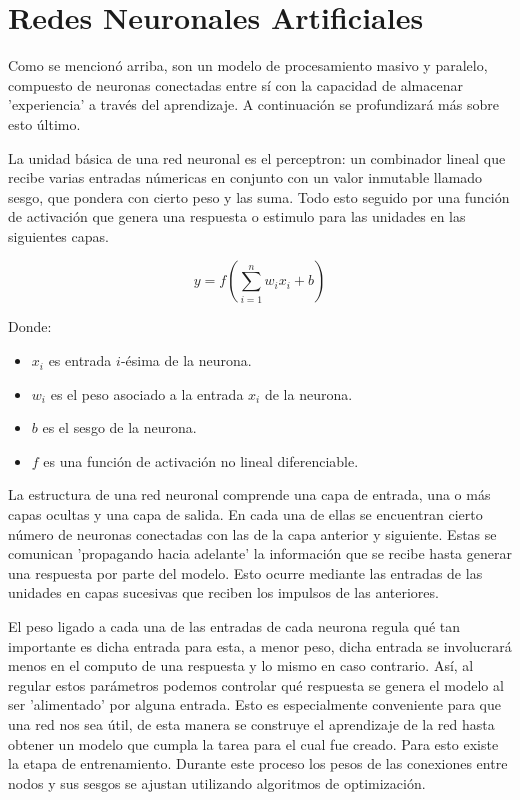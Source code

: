 \section{Redes Neuronales Artificiales}
Como se mencionó arriba, son un modelo de procesamiento masivo y paralelo, compuesto de neuronas conectadas entre sí con la capacidad de almacenar 'experiencia' a través del aprendizaje. A continuación se profundizará más sobre esto último. 

La unidad básica de una red neuronal es el perceptron: un combinador lineal que recibe varias entradas númericas en conjunto con un valor inmutable llamado sesgo, que pondera con cierto peso y las suma. Todo esto seguido por una función de activación que genera una respuesta o estimulo para las unidades en las siguientes capas.

\[
y = f\left(\sum_{i=1}^{n} w_i x_i + b\right)
\]

Donde:
\begin{itemize}
    \item $x_i$ es entrada $i$-ésima de la neurona.
    \item $w_i$ es el peso asociado a la entrada $x_i$ de la neurona.
    \item $b$ es el sesgo de la neurona.
    \item $f$ es una función de activación no lineal diferenciable.
\end{itemize}

La estructura de una red neuronal comprende una capa de entrada, una o más capas ocultas y una capa de salida. En cada una de ellas se encuentran cierto número de neuronas conectadas con las de la capa anterior y siguiente. Estas se comunican 'propagando hacia adelante' la información que se recibe hasta generar una respuesta por parte del modelo. Esto ocurre mediante las entradas de las unidades en capas sucesivas que reciben los impulsos de las anteriores. 

El peso ligado a cada una de las entradas de cada neurona regula qué tan importante es dicha entrada para esta, a menor peso, dicha entrada se involucrará menos en el computo de una respuesta y lo mismo en caso contrario. Así, al regular estos parámetros podemos controlar qué respuesta se genera el modelo al ser 'alimentado' por alguna entrada. Esto es especialmente conveniente para que una red nos sea útil, de esta manera se construye el aprendizaje de la red hasta obtener un modelo que cumpla la tarea para el cual fue creado. Para esto existe la etapa de entrenamiento. Durante este proceso los pesos de las conexiones entre nodos y sus sesgos se ajustan utilizando algoritmos de optimización.

